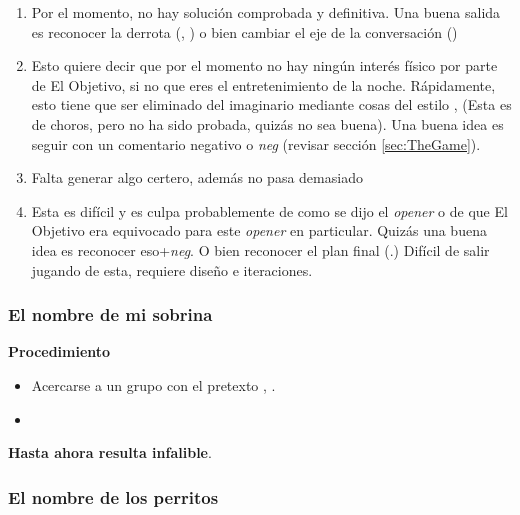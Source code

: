 \documentclass{article}
\begin{document}
\begin{enumerate}
\item Por el momento, no hay solución comprobada y definitiva. Una buena salida es reconocer la derrota (, ) o bien cambiar el eje de la conversación ()
\item Esto quiere decir que por el momento no hay ningún interés físico por parte de El Objetivo, si no que eres el entretenimiento de la noche. Rápidamente, esto tiene que ser eliminado del imaginario mediante cosas del estilo ,  ({\color{red}Esta es de choros, pero no ha sido probada, quizás no sea buena}). Una buena idea es seguir con un comentario negativo o \textit{neg} (revisar sección \ref{sec:TheGame}).
\item {\color{red}Falta generar algo certero, además no pasa demasiado}
\item Esta es difícil y es culpa probablemente de como se dijo el \textit{opener} o de que El Objetivo era equivocado para este \textit{opener} en particular. Quizás una buena idea es reconocer eso+\textit{neg}. O bien reconocer el plan final (.) {\color{red} Difícil de salir jugando de esta, requiere diseño e iteraciones}.
\end{enumerate}
\subsubsection{El nombre de mi sobrina}

\textbf{Procedimiento}
\begin{itemize}
\item Acercarse a un grupo con el pretexto , .
\item {}
\end{itemize}

\textbf{Hasta ahora resulta infalible}.

\subsubsection{El nombre de los perritos }
\end{document}
